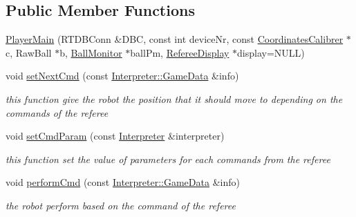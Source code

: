 \subsection*{Public Member Functions}
\begin{DoxyCompactItemize}
\item 
\hyperlink{classPlayerMain_a12957aeecc6902370f03ff2ffbb0551d}{PlayerMain} (RTDBConn \&DBC, const int deviceNr, const \hyperlink{classCoordinatesCalibrer}{CoordinatesCalibrer} $\ast$c, RawBall $\ast$b, \hyperlink{classBallMonitor}{BallMonitor} $\ast$ballPm, \hyperlink{classRefereeDisplay}{RefereeDisplay} $\ast$display=NULL)
\item 
void \hyperlink{classPlayerMain_a8f0320189df15529662c7f16d2f74084}{setNextCmd} (const \hyperlink{structInterpreter_1_1GameData}{Interpreter::GameData} \&info)
\begin{DoxyCompactList}\small\item\em this function give the robot the position that it should move to depending on the commands of the referee \item\end{DoxyCompactList}\item 
void \hyperlink{classPlayerMain_a5c4af159392663660f91809052422945}{setCmdParam} (const \hyperlink{classInterpreter}{Interpreter} \&interpreter)
\begin{DoxyCompactList}\small\item\em this function set the value of parameters for each commands from the referee \item\end{DoxyCompactList}\item 
void \hyperlink{classPlayerMain_af12a95c226ce973056681a138b55fb6c}{performCmd} (const \hyperlink{structInterpreter_1_1GameData}{Interpreter::GameData} \&info)
\begin{DoxyCompactList}\small\item\em the robot perform based on the command of the referee \item\end{DoxyCompactList}\end{DoxyCompactItemize}
